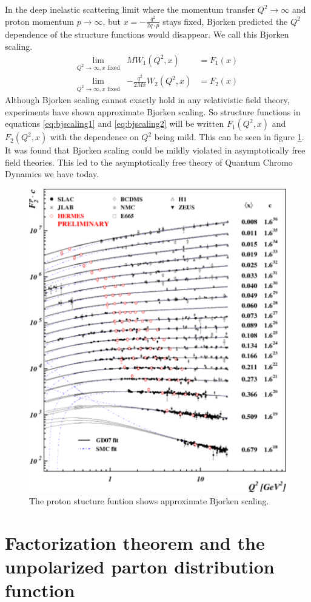\documentclass[abstract = on,listof=totoc, bibliography=totoc]{scrreprt}
\begin{document}
In the deep inelastic scattering limit where the momentum transfer $Q^2\rightarrow\infty$ and proton momentum $p\rightarrow\infty$, but $x = -\frac{q^2}{2q\cdot p}$ stays fixed, Bjorken predicted the $Q^2$ dependence of the structure functions would disappear. We call this Bjorken scaling.
\begin{eqnarray}
\lim\limits_{Q^2\rightarrow\infty, x \text{ fixed}}& MW_1(Q^2,x) &= F_1(x) \label{eq:bjscaling1}\\
\lim\limits_{Q^2\rightarrow\infty, x \text{ fixed}}& -\frac{q^2}{2Mx}W_2(Q^2,x) &= F_2(x) \label{eq:bjscaling2}
\end{eqnarray}
Although Bjorken scaling cannot exactly hold in any relativistic field theory, experiments have shown approximate Bjorken scaling. So structure functions in equations \ref{eq:bjscaling1} and \ref{eq:bjscaling2} will be written $F_1(Q^2,x)$ and $F_2(Q^2,x)$ with the dependence on $Q^2$ being mild. This can be seen in figure \ref{fig:F2Scaling}. It was found that Bjorken scaling could be mildly violated in asymptotically free field theories. This led to the asymptotically free theory of Quantum Chromo Dynamics we have today. 
\begin{figure}
\begin{center}
\includegraphics[width = .6\textwidth]{StructFunc2}
\caption[Scaling of the proton structure function $F_2$]{The proton stucture funtion shows approximate Bjorken scaling.}
\label{fig:F2Scaling}
\end{center}
\end{figure}



\section{Factorization theorem and the unpolarized parton distribution function}
\end{document}
